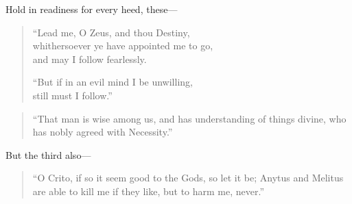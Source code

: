 Hold in readiness for every heed, these---

\begin{quote}
  ``Lead me, O Zeus, and thou Destiny,\\
  whithersoever ye have appointed me to go,\\
  and may I follow fearlessly.
  
  ``But if in an evil mind I be unwilling,\\
  still must I follow.''
\end{quote}

\begin{quote}
  ``That man is wise among us, 
  and has understanding of things divine, 
  who has nobly agreed with Necessity.''
\end{quote}

But the third also---

\begin{quote}
  ``O Crito, if so it seem good to the Gods, so let it be; 
  Anytus and Melitus are able to kill me if they like, 
  but to harm me, never.''
\end{quote}
